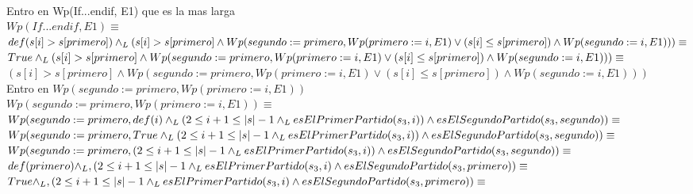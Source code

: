 \documentclass[10pt,a4paper]{article}
\begin{document}
\begin{enumerate}
\\
Entro en Wp(If...endif, E1) que es la mas larga
\vspace{0.3cm}
\\
$Wp(If...endif, E1)\equiv$
\vspace{0.3cm}
\\
$def(s[i] > s[primero])\land _L (s[i] > s[primero] \land Wp(segundo:=primero, Wp(primero:=i, E1) \lor (s[i] \leq s[primero]) \land Wp(segundo:= i, E1)))\equiv$
\vspace{0.3cm}
\\
$True\land _L (s[i] > s[primero] \land Wp(segundo:=primero, Wp(primero:=i, E1) \lor (s[i] \leq s[primero]) \land Wp(segundo:= i, E1)))\equiv$
\vspace{0.3cm}
\\
$(s[i] > s[primero] \land Wp(segundo:=primero, Wp(primero:=i, E1) \lor (s[i] \leq s[primero]) \land Wp(segundo:= i, E1)))$
\vspace{0.3cm}
\\
Entro en $Wp(segundo:=primero, Wp(primero:= i, E1))$
\vspace{0.3cm}
\\
$Wp(segundo:=primero, Wp(primero:= i, E1))\equiv$
\vspace{0.3cm}
\\
$Wp(segundo:=primero, def(i) \land _L (2\leq i+1 \leq |s|-1 \land _L 
esElPrimerPartido(s_3, i)) \land
\\
esElSegundoPartido(s_3, segundo))\equiv$
\vspace{0.3cm}
\\
$Wp(segundo:=primero, True \land _L (2\leq i+1 \leq |s|-1 \land _L 
esElPrimerPartido(s_3, i)) \land
\\
esElSegundoPartido(s_3, segundo))\equiv$
\vspace{0.3cm}
\\
$Wp(segundo:=primero,(2\leq i+1 \leq |s|-1 \land _L 
esElPrimerPartido(s_3, i)) \land
\\
esElSegundoPartido(s_3, segundo))\equiv$
\vspace{0.3cm}
\\
$def(primero) \land _L ,(2\leq i+1 \leq |s|-1 \land _L 
esElPrimerPartido(s_3, i) \land
\\
esElSegundoPartido(s_3, primero))\equiv$
\vspace{0.3cm}
\\
$True \land _L ,(2\leq i+1 \leq |s|-1 \land _L 
esElPrimerPartido(s_3, i) \land
\\
esElSegundoPartido(s_3, primero))\equiv$
\vspace{0.3cm}

\end{enumerate}
\end{document}
